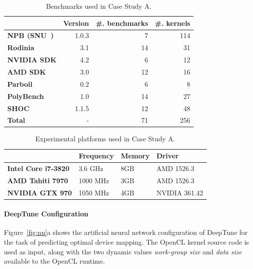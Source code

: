 \begin{table}
  \centering%
  \begin{tabular}{| l r r r |}
    \hline
    \rowcolor{gray!50}
    & \textbf{Version} & \textbf{\#. benchmarks} & \textbf{\#. kernels}\\
    \hline
    \textbf{NPB (SNU~\cite{Seo2011})} & 1.0.3 & 7 & 114 \\
    \textbf{Rodinia~\cite{Che2009}} & 3.1 & 14 & 31 \\
    \textbf{NVIDIA SDK} & 4.2 & 6 & 12 \\
    \textbf{AMD SDK} & 3.0 & 12 & 16 \\
    \textbf{Parboil~\cite{Stratton2012}} & 0.2 & 6 & 8 \\
    \textbf{PolyBench~\cite{Grauer-Gray2012}} & 1.0 & 14 & 27 \\
    \textbf{SHOC~\cite{Danalis2010}} & 1.1.5 & 12 & 48 \\
    \textbf{Total} & - & 71 & 256 \\
    \hline
  \end{tabular}
  \caption[Benchmarks used in Case Study A]{%
    Benchmarks used in Case Study A.%
  }
  \label{tab:cgo-benchmarks}
\end{table}

\begin{table}[t!]
  \centering %
    \begin{tabular}{| l l l l| }
      \hline
      \rowcolor{gray!50}
      & \textbf{Frequency} & \textbf{Memory} & \textbf{Driver} \\
      \hline
      \textbf{Intel Core i7-3820} & 3.6 GHz & 8GB & AMD 1526.3 \\
      \textbf{AMD Tahiti 7970} & 1000 MHz & 3GB & AMD 1526.3 \\
      \textbf{NVIDIA GTX 970} & 1050 MHz & 4GB & NVIDIA 361.42 \\
      \hline
    \end{tabular}
    \caption[Benchmarks used in Case Study A]{%
    Experimental platforms used in Case Study A.%
    }
    \label{tab:cgo-platforms}
\end{table}


\paragraph*{DeepTune Configuration}

Figure~\ref{fig:nn}a shows the artificial neural network configuration of DeepTune for the task of predicting optimal device mapping. The OpenCL kernel source code is used as input, along with the two dynamic values \emph{work-group size} and \emph{data size} available to the OpenCL runtime.

